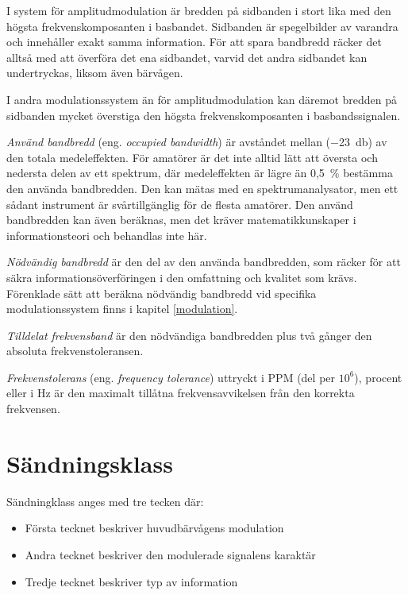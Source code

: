 I system för amplitudmodulation är bredden på sidbanden i stort lika med den
högsta frekvenskomposanten i basbandet.
Sidbanden är spegelbilder av varandra och innehåller exakt samma information.
För att spara bandbredd räcker det alltså med att överföra det ena sidbandet,
varvid det andra sidbandet kan undertryckas, liksom även bärvågen.

I andra modulationssystem än för amplitudmodulation kan däremot bredden på
sidbanden mycket överstiga den högsta frekvenskomposanten i basbandssignalen.

\emph{Använd bandbredd} (eng. \emph{occupied bandwidth}) är avståndet mellan
(\SI{-23}{\decibel}) av den totala medeleffekten.
För amatörer är det inte alltid lätt att översta och nedersta delen av ett
spektrum, där medeleffekten är lägre än 0,5~\% bestämma den använda bandbredden.
Den kan mätas med en spektrumanalysator, men ett sådant instrument är
svårtillgänglig för de flesta amatörer.
Den använd bandbredden kan även beräknas, men det kräver matematikkunskaper i
informationsteori och behandlas inte här.

\emph{Nödvändig bandbredd} är den del av den använda bandbredden, som räcker
för att säkra informationsöverföringen i den omfattning och kvalitet som krävs.
Förenklade sätt att beräkna nödvändig bandbredd vid specifika modulationssystem
finns i kapitel \ref{modulation}.

\emph{Tilldelat frekvensband} är den nödvändiga bandbredden plus två gånger den
absoluta frekvenstoleransen.

\emph{Frekvenstolerans} (eng. \emph{frequency tolerance}) uttryckt i PPM (del
per \(10^6\)), procent eller i \si{\hertz} är den maximalt tillåtna
frekvensavvikelsen från den korrekta frekvensen.

\section{Sändningsklass}

Sändningklass anges med tre tecken där:

\begin{itemize}
\item 
	Första tecknet beskriver huvudbärvågens modulation 
\item 
	Andra tecknet beskriver den modulerade signalens karaktär 
\item 
	Tredje tecknet beskriver typ av information 
\end{itemize}

